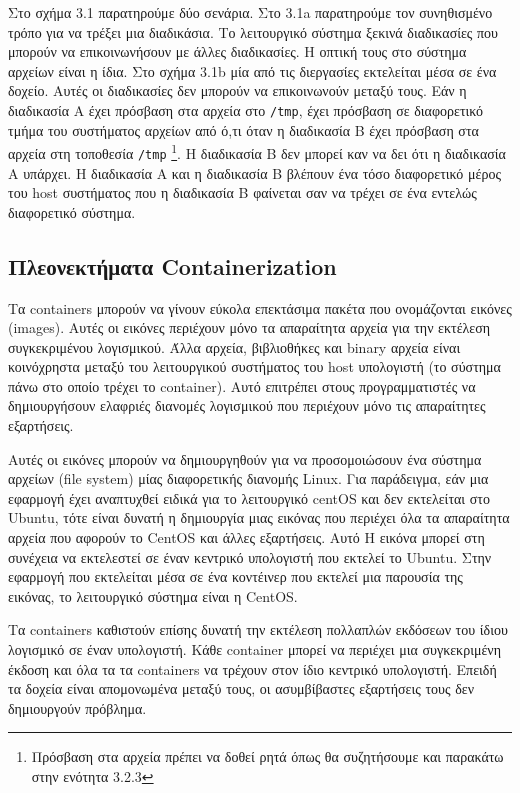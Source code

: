 Στο σχήμα 3.1 παρατηρούμε δύο σενάρια. Στο 3.1a παρατηρούμε τον συνηθισμένο τρόπο για να τρέξει μια διαδικάσια.
Το λειτουργικό σύστημα ξεκινά διαδικασίες που μπορούν να επικοινωνήσουν με
άλλες διαδικασίες. Η οπτική τους στο σύστημα αρχείων είναι η ίδια.
Στο σχήμα 3.1b μία από τις διεργασίες εκτελείται μέσα σε ένα δοχείο.
Αυτές οι διαδικασίες δεν μπορούν να επικοινωνούν μεταξύ τους. Εάν η
διαδικασία Α έχει πρόσβαση στα αρχεία στο  \texttt{\textlatin{/tmp}}, έχει πρόσβαση σε διαφορετικό
τμήμα του συστήματος αρχείων από ό,τι όταν η διαδικασία Β έχει πρόσβαση στα
αρχεία στη τοποθεσία \texttt{\textlatin{/tmp}} 
\footnote{Πρόσβαση στα αρχεία πρέπει να δοθεί ρητά όπως θα συζητήσουμε και παρακάτω στην ενότητα 3.2.3}.
Η διαδικασία Β δεν μπορεί καν να δει ότι η διαδικασία Α υπάρχει.
Η διαδικασία Α και η διαδικασία Β βλέπουν ένα τόσο διαφορετικό μέρος του
\textlatin{host} συστήματος που η διαδικασία Β φαίνεται σαν να τρέχει σε ένα
εντελώς διαφορετικό σύστημα.

\subsection{Πλεονεκτήματα \textlatin{Containerization}}

Τα \textlatin{containers} μπορούν να γίνουν εύκολα επεκτάσιμα πακέτα
που ονομάζονται εικόνες (\textlatin{images}).
Αυτές οι εικόνες περιέχουν μόνο τα απαραίτητα αρχεία για την εκτέλεση
συγκεκριμένου λογισμικού. Άλλα αρχεία, βιβλιοθήκες και \textlatin{binary}
αρχεία είναι κοινόχρηστα μεταξύ του λειτουργικού συστήματος του
\textlatin{host} υπολογιστή (το σύστημα πάνω στο οποίο τρέχει το
\textlatin{container}). Αυτό επιτρέπει στους προγραμματιστές
να δημιουργήσουν ελαφριές διανομές λογισμικού που περιέχουν μόνο
τις απαραίτητες εξαρτήσεις.


Αυτές οι εικόνες μπορούν να δημιουργηθούν για να προσομοιώσουν ένα σύστημα
αρχείων (\textlatin{file system})
μίας διαφορετικής διανομής \textlatin{Linux}. Για παράδειγμα, εάν μια
εφαρμογή έχει αναπτυχθεί ειδικά για το λειτουργικό \textlatin{centOS} και
δεν εκτελείται στο \textlatin{Ubuntu}, τότε είναι δυνατή η
δημιουργία μιας εικόνας που περιέχει όλα τα απαραίτητα αρχεία που αφορούν το
\textlatin{CentOS} και άλλες εξαρτήσεις. Αυτό Η εικόνα μπορεί στη συνέχεια να εκτελεστεί
σε έναν κεντρικό υπολογιστή που εκτελεί το \textlatin{Ubuntu}. Στην εφαρμογή που
εκτελείται μέσα σε ένα κοντέινερ που εκτελεί μια παρουσία της εικόνας, το
λειτουργικό σύστημα είναι η \textlatin{CentOS}.

Τα \textlatin{containers} καθιστούν επίσης δυνατή την εκτέλεση πολλαπλών
εκδόσεων του ίδιου λογισμικό σε έναν υπολογιστή.
Κάθε \textlatin{container} μπορεί να
περιέχει μια συγκεκριμένη έκδοση και όλα τα τα \textlatin{containers} να τρέχουν
στον ίδιο κεντρικό υπολογιστή. Επειδή τα δοχεία είναι απομονωμένα μεταξύ τους,
οι ασυμβίβαστες εξαρτήσεις τους δεν δημιουργούν πρόβλημα. \\


